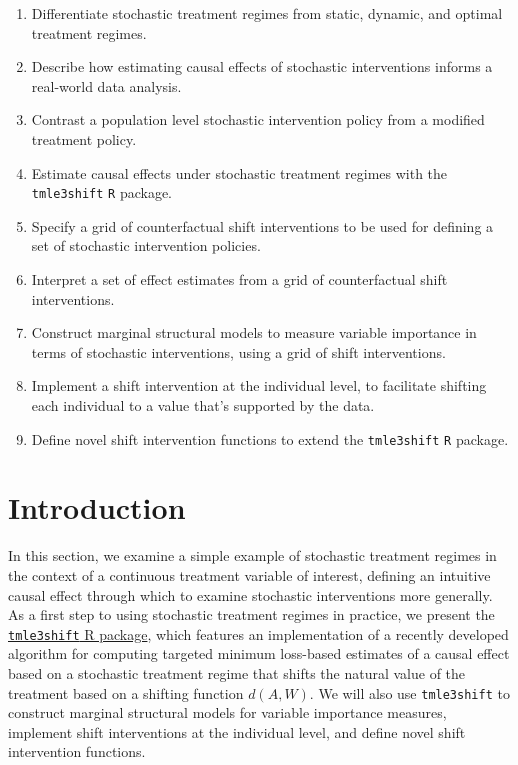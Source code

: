 \documentclass[
  12pt, krantz2,
]{book}
\newcommand{\passthrough}[1]{#1}
\providecommand{\tightlist}{%
  \setlength{\itemsep}{0pt}\setlength{\parskip}{0pt}}
\theoremstyle{definition}
\theoremstyle{definition}
\theoremstyle{definition}
\newcommand{\1}{\mathbbm{1}}
\begin{document}
\begin{enumerate}
\def\labelenumi{\arabic{enumi}.}
\tightlist
\item
  Differentiate stochastic treatment regimes from static, dynamic, and optimal
  treatment regimes.
\item
  Describe how estimating causal effects of stochastic interventions informs a
  real-world data analysis.
\item
  Contrast a population level stochastic intervention policy from a modified
  treatment policy.
\item
  Estimate causal effects under stochastic treatment regimes with the
  \passthrough{\lstinline!tmle3shift!} \passthrough{\lstinline!R!} package.
\item
  Specify a grid of counterfactual shift interventions to be used for defining
  a set of stochastic intervention policies.
\item
  Interpret a set of effect estimates from a grid of counterfactual shift
  interventions.
\item
  Construct marginal structural models to measure variable importance in terms
  of stochastic interventions, using a grid of shift interventions.
\item
  Implement a shift intervention at the individual level, to facilitate
  shifting each individual to a value that's supported by the data.
\item
  Define novel shift intervention functions to extend the \passthrough{\lstinline!tmle3shift!} \passthrough{\lstinline!R!}
  package.
\end{enumerate}

\hypertarget{introduction-2}{%
\section{Introduction}\label{introduction-2}}

In this section, we examine a simple example of stochastic treatment regimes in
the context of a continuous treatment variable of interest, defining an
intuitive causal effect through which to examine stochastic interventions more
generally. As a first step to using stochastic
treatment regimes in practice, we present the \href{https://github.com/tlverse/tmle3shift}{\passthrough{\lstinline!tmle3shift!} R
package}, which features an
implementation of a recently developed algorithm for computing targeted minimum
loss-based estimates of a causal effect based on a stochastic treatment regime
that shifts the natural value of the treatment based on a shifting function
\(d(A,W)\). We will also use \passthrough{\lstinline!tmle3shift!} to construct marginal structural models
for variable importance measures, implement shift interventions at the
individual level, and define novel shift intervention functions.
\end{document}
